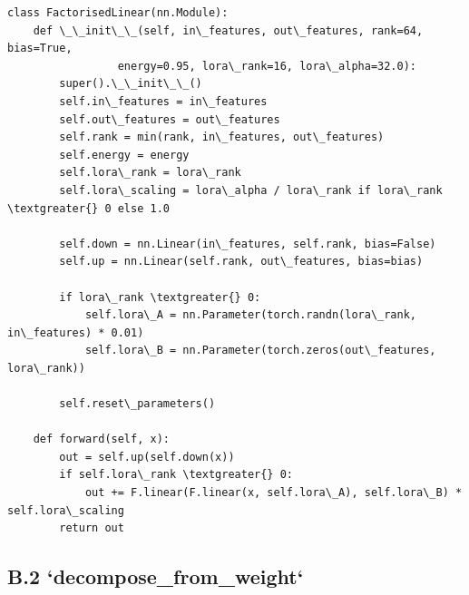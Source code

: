 \begin{lstlisting}
class FactorisedLinear(nn.Module):
    def \_\_init\_\_(self, in\_features, out\_features, rank=64, bias=True,
                 energy=0.95, lora\_rank=16, lora\_alpha=32.0):
        super().\_\_init\_\_()
        self.in\_features = in\_features
        self.out\_features = out\_features
        self.rank = min(rank, in\_features, out\_features)
        self.energy = energy
        self.lora\_rank = lora\_rank
        self.lora\_scaling = lora\_alpha / lora\_rank if lora\_rank \textgreater{} 0 else 1.0
        
        self.down = nn.Linear(in\_features, self.rank, bias=False)
        self.up = nn.Linear(self.rank, out\_features, bias=bias)
        
        if lora\_rank \textgreater{} 0:
            self.lora\_A = nn.Parameter(torch.randn(lora\_rank, in\_features) * 0.01)
            self.lora\_B = nn.Parameter(torch.zeros(out\_features, lora\_rank))
        
        self.reset\_parameters()
    
    def forward(self, x):
        out = self.up(self.down(x))
        if self.lora\_rank \textgreater{} 0:
            out += F.linear(F.linear(x, self.lora\_A), self.lora\_B) * self.lora\_scaling
        return out
\end{lstlisting}

\subsection{B.2 `decompose\_from\_weight`}

